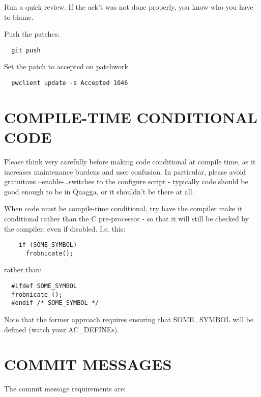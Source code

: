 \documentclass[oneside]{article}
\begin{document}
Run a quick review. If the ack't was not done properly, you know who you have
to blame.

Push the patches:
\begin{verbatim}
  git push
\end{verbatim}

Set the patch to accepted on patchwork
\begin{verbatim}
  pwclient update -s Accepted 1046
\end{verbatim}

\section{COMPILE-TIME CONDITIONAL CODE}

Please think very carefully before making code conditional at compile time,
as it increases maintenance burdens and user confusion. In particular,
please avoid gratuitous --enable-\ldots switches to the configure script -
typically code should be good enough to be in Quagga, or it shouldn't be
there at all. 

When code must be compile-time conditional, try have the compiler make it
conditional rather than the C pre-processor - so that it will still be
checked by the compiler, even if disabled. I.e.  this:

\begin{verbatim}
    if (SOME_SYMBOL)
      frobnicate();
\end{verbatim}

rather than:

\begin{verbatim}
  #ifdef SOME_SYMBOL
  frobnicate ();
  #endif /* SOME_SYMBOL */
\end{verbatim}

Note that the former approach requires ensuring that SOME\_SYMBOL will be
defined (watch your AC\_DEFINEs).


\section{COMMIT MESSAGES}

The commit message requirements are:
\end{document}
